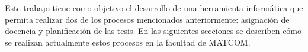 


Este trabajo tiene como objetivo el desarrollo de una herramienta informática
que permita realizar dos de los procesos mencionados anteriormente:
asignación de docencia y planificación de las tesis.
En las siguientes secciones se describen cómo se realizan actualmente
estos procesos en la facultad de MATCOM.






